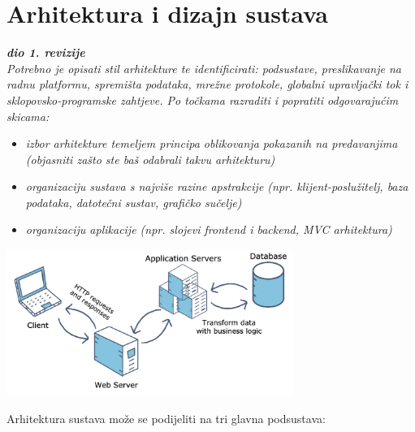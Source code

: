 \chapter{Arhitektura i dizajn sustava}
		
		\textbf{\textit{dio 1. revizije}}\\

		\textit{ Potrebno je opisati stil arhitekture te identificirati: podsustave, preslikavanje na radnu platformu, spremišta podataka, mrežne protokole, globalni upravljački tok i sklopovsko-programske zahtjeve. Po točkama razraditi i popratiti odgovarajućim skicama:}
	\begin{itemize}
		\item 	\textit{izbor arhitekture temeljem principa oblikovanja pokazanih na predavanjima (objasniti zašto ste baš odabrali takvu arhitekturu)}
		\item 	\textit{organizaciju sustava s najviše razine apstrakcije (npr. klijent-poslužitelj, baza podataka, datotečni sustav, grafičko sučelje)}
		\item 	\textit{organizaciju aplikacije (npr. slojevi frontend i backend, MVC arhitektura) }		
	\end{itemize}
	
		\begin{center}
		\includegraphics[width=0.7\textwidth]{slike/arh.png} %
	\end{center}

	Arhitektura sustava može se podijeliti na tri glavna podsustava:
	
